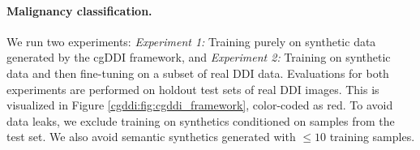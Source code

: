 \documentclass[11pt]{ucthesis}
\begin{document}
\begin{table}
  \caption{\textbf{Malignancy Classification and Fairness Performance.} Abbreviations: ``R." denotes real data, ``S." denotes synthetic data, ``R. + S." denotes a combination of both.}
  \label{cgddi:perf_table}
  \centering
  \scriptsize
  \setlength\tabcolsep{4pt}
\end{table}

\paragraph{Malignancy classification.}
We run two experiments: \textit{Experiment 1:} Training purely on synthetic data generated by the cgDDI framework, and \textit{Experiment 2:} Training on synthetic data and then fine-tuning on a subset of real DDI data. Evaluations for both experiments are performed on holdout test sets of real DDI images. This is visualized in Figure \ref{cgddi:fig:cgddi_framework}, color-coded as red. To avoid data leaks, we exclude training on synthetics conditioned on samples from the test set. We also avoid semantic synthetics generated with $\leq 10$ training samples.
\end{document}
